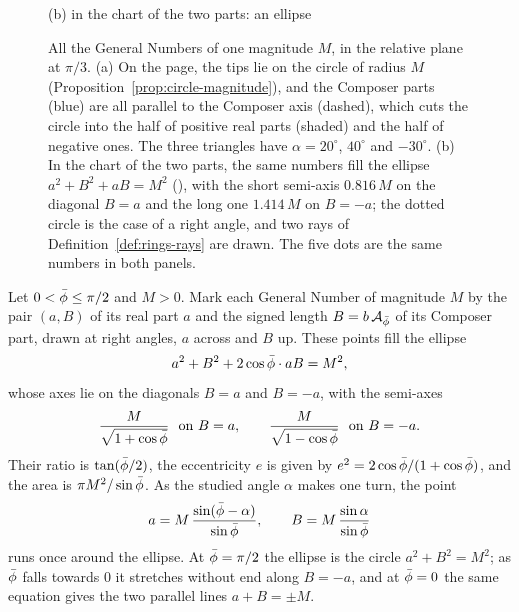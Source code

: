 \begin{figure}[tb]
\begin{minipage}[b]{0.5\textwidth}
\smallskip
{\small (b) in the chart of the two parts: an ellipse\par}
\end{minipage}
\caption[All the numbers of one magnitude]{All the General Numbers of one magnitude $M$, in the relative plane at $\pi/3$. (a) On the page, the tips lie on the circle of radius $M$ (Proposition~\ref{prop:circle-magnitude}), and the Composer parts (blue) are all parallel to the Composer axis (dashed), which cuts the circle into the half of positive real parts (shaded) and the half of negative ones. The three triangles have $\alpha = 20^\circ$, $40^\circ$ and $-30^\circ$. (b) In the chart of the two parts, the same numbers fill the ellipse $a^2 + B^2 + aB = M^2$ (), with the short semi-axis $0.816\,M$ on the diagonal $B = a$ and the long one $1.414\,M$ on $B = -a$; the dotted circle is the case of a right angle, and two rays of Definition~\ref{def:rings-rays} are drawn. The five dots are the same numbers in both panels.}
\label{fig:one-magnitude}
\end{figure}

\begin{theorem}\label{thm:ellipse}
Let $0 < \bar{\phi} \le \pi/2$ and $M > 0$. Mark each General Number of magnitude $M$ by the pair $(a, B)$ of its real part $a$ and the signed length $B = b\,\mathcal{A}_{\bar{\phi}}$ of its Composer part, drawn at right angles, $a$ across and $B$ up. These points fill the ellipse
\[
a^2 + B^2 + 2\cos\bar{\phi} \cdot a B = M^2 ,
\]
whose axes lie on the diagonals $B = a$ and $B = -a$, with the semi-axes
\[
\frac{M}{\sqrt{1 + \cos\pb}} \ \text{ on } B = a, \qquad \frac{M}{\sqrt{1 - \cos\pb}} \ \text{ on } B = -a .
\]
Their ratio is $\tan(\bar{\phi}/2)$, the eccentricity $e$ is given by $e^2 = 2\cos\bar{\phi}/(1 + \cos\bar{\phi})$, and the area is $\pi M^2/\sin\bar{\phi}$. As the studied angle $\alpha$ makes one turn, the point
\[
a = M\,\frac{\sin(\bar{\phi} - \alpha)}{\sin\bar{\phi}}, \qquad B = M\,\frac{\sin\alpha}{\sin\bar{\phi}}
\]
runs once around the ellipse. At $\bar{\phi} = \pi/2$ the ellipse is the circle $a^2 + B^2 = M^2$; as $\bar{\phi}$ falls towards $0$ it stretches without end along $B = -a$, and at $\bar{\phi} = 0$ the same equation gives the two parallel lines $a + B = \pm M$.
\end{theorem}

